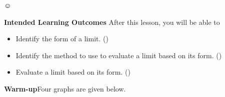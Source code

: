 \documentclass[10pt]{article}
\begin{document}
☺
\pagestyle{otherpages}
\thispagestyle{firstpage}

\textbf{Intended Learning Outcomes}
After this lesson, you will be able to 

\begin{itemize}
    \item Identify the form of a limit. ()
    \item Identify the method to use to evaluate a limit based on its form. ()
    \item Evaluate a limit based on its form. ()
\end{itemize}

\vspace{-0.5cm}

\hrulefill

{\bf\color{blue}Warm-up}\exercise Four graphs are given below.\\
\end{document}
